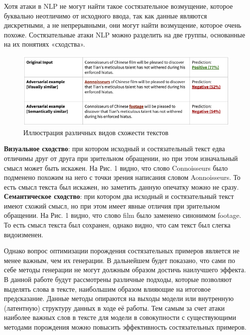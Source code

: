 Хотя атаки в NLP не могут найти такое состязательное возмущение, которое буквально неотличимо от исходного ввода, так как данные являются дискретными, а не непрерывными, они могут найти возмущение, которое очень похоже. Состязательные атаки NLP можно разделить на две группы, основанные на их понятиях «сходства».

\begin{figure}[h]
    \centering
    \begin{adjustbox}{max width=\linewidth}
        \includegraphics{pictures/texts_similarity.png}
    \end{adjustbox}
    \caption{Иллюстрация различных видов схожести текстов}
    \label{fig:texts_similarity}
\end{figure}

\noindent\hspace{0.6cm}\textbf{Визуальное сходство}: при котором исходный и состязательный текст едва отличимы друг от друга при зрительном обращении, но при этом изначальный смысл может быть искажен. На Рис. 1 видно, что слово \textcolor[RGB]{0,128,0}{Connoisseurs} было подменено похожим на него с точки зрения написания словом \textcolor[RGB]{128,0,0}{Aonnoisseurs}. То есть смысл текста был искажен, но заметить данную опечатку можно не сразу. \textbf{Семантическое сходство}: при котором два исходный и состязательный текст имеют схожий смысл, но при этом имеет явные отличия при зрительном обращении. На Рис. 1 видно, что слово \textcolor[RGB]{0,128,0}{film} было заменено синонимом \textcolor[RGB]{128,0,0}{footage}. То есть смысл текста был сохранен, однако видно, что сам текст был слегка видоизменен.

\noindent\hspace{0.6cm}Однако вопрос оптимизации порождения состязательных примеров является не менее важным, чем их генерации. В дальнейшем будет показано, что сами по себе методы генерации не могут должным образом достичь наилучшего эффекта. В данной работе будут рассмотрены различные подходы, которые позволяют выделять слова в тексте, наибольшим образом влияющие на итоговое предсказание. Данные методы опираются на выходы модели или внутренную (латентную) структуру данных в ходе её работы. Тем самым за счет атаки наиболее важных слов в тексте для модели в совокупности с существующими методами порождения можно повысить эффективность состязательных примеров.
